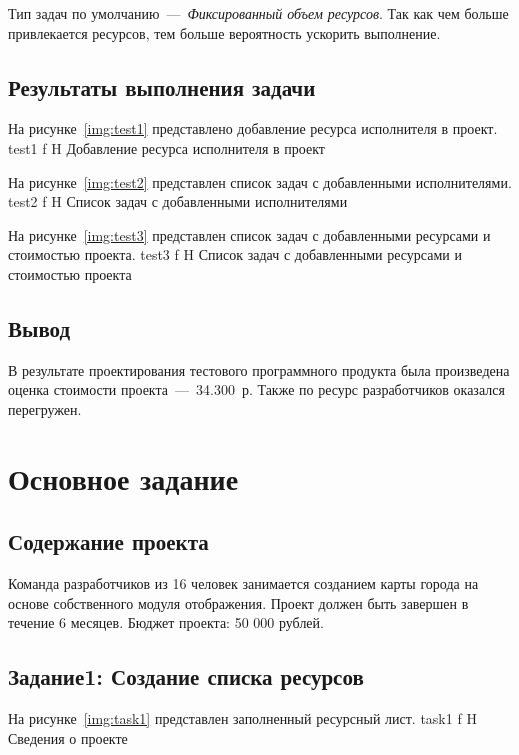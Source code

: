 Тип задач по умолчанию~---~\textit{Фиксированный объем ресурсов}.
Так как чем больше привлекается ресурсов, тем больше вероятность ускорить выполнение.

\subsection{Результаты выполнения задачи}

На рисунке~\ref{img:test1} представлено добавление ресурса исполнителя в проект.
	{test1}
	{f}
	{H}
	{\textwidth}
	{Добавление ресурса исполнителя в проект}

На рисунке~\ref{img:test2} представлен список задач с добавленными исполнителями.
	{test2}
	{f}
	{H}
	{\textwidth}
	{Список задач с добавленными исполнителями}

На рисунке~\ref{img:test3} представлен список задач с добавленными ресурсами и стоимостью проекта.
	{test3}
	{f}
	{H}
	{\textwidth}
	{Список задач с добавленными ресурсами и стоимостью проекта}

\subsection{Вывод}

В результате проектирования тестового программного продукта была произведена оценка стоимости проекта~---~34.300~р.
Также по ресурс разработчиков оказался перегружен.

\clearpage
\section{Основное задание}

\subsection{Содержание проекта}

Команда разработчиков из 16 человек занимается созданием карты города на основе собственного модуля отображения. 
Проект должен быть завершен в течение 6 месяцев. 
Бюджет проекта: 50 000 рублей.

\subsection{Задание1: Создание списка ресурсов}

На рисунке~\ref{img:task1} представлен заполненный ресурсный лист.
	{task1}
	{f}
	{H}
	{\textwidth}
	{Сведения о проекте}

